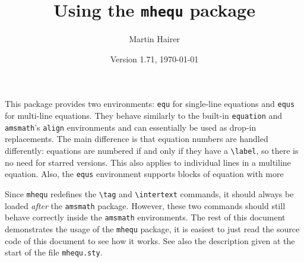 \documentclass{article}
\begin{document}
\title{Using the \texttt{mhequ} package}
\author{Martin Hairer}
\date{Version 1.71, \today}
\maketitle
\thispagestyle{empty}


This package provides two environments: \texttt{equ} for single-line equations
and \texttt{equs} for multi-line equations. They behave similarly to the built-in
\texttt{equation} and \texttt{amsmath}'s \texttt{align} environments and can essentially
be used as drop-in replacements. The main difference is that equation numbers are 
handled differently: equations are numbered if and only if they have a \verb|\label|,
so there is no need for starred versions. This also applies to individual lines in
a multiline equation. Also, the \texttt{equs} environment supports blocks of equation
with more

Since \texttt{mhequ} redefines the \verb|\tag| and \verb|\intertext| commands, it should
always be loaded \textit{after} the \texttt{amsmath} package. However, these
two commands should still behave correctly inside the \texttt{amsmath} environments.
The rest of this document demonstrates the usage of the \texttt{mhequ} package,
it is easiest to just read the source code of this document to see how it works.
See also the description given at the start of the file \texttt{mhequ.sty}.
\end{document}
